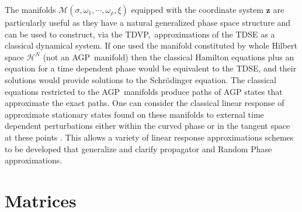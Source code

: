 \documentclass[aps,preprint]{revtex4}%
\begin{document}
The manifolds $\mathcal{M}\left(  \sigma,\omega_{1},\cdots,\omega_{\rho}%
,\xi\right)  $ equipped with the coordinate system $\mathbf{z}$ are
particularly useful as they have a natural generalized phase space structure
and can be used to construct, via the TDVP,\ approximations of the TDSE as a
classical dynamical system. If one used the manifold constituted by whole
Hilbert space $\mathcal{H}^{N}$ (not an AGP\ manifold) then the classical
Hamilton equations plus an equation for a time dependent phase would be
equivalent to the TDSE, and their solutions would provide solutions to the
Schr\"{o}dinger equation. The classical equations restricted to the
AGP\ manifolds produce paths of AGP states that approximate the exact paths.
One can consider the classical linear response of approximate stationary
states found on these manifolds to external time dependent perturbations
either within the curved phase or in the tangent space at these points
\cite{Weiner94}. This allows a variety of linear response approximations
schemes to be developed that generalize and clarify propagator and Random
Phase approximations.

\appendix


\section{Matrices\label{Matrices}}
\end{document}
